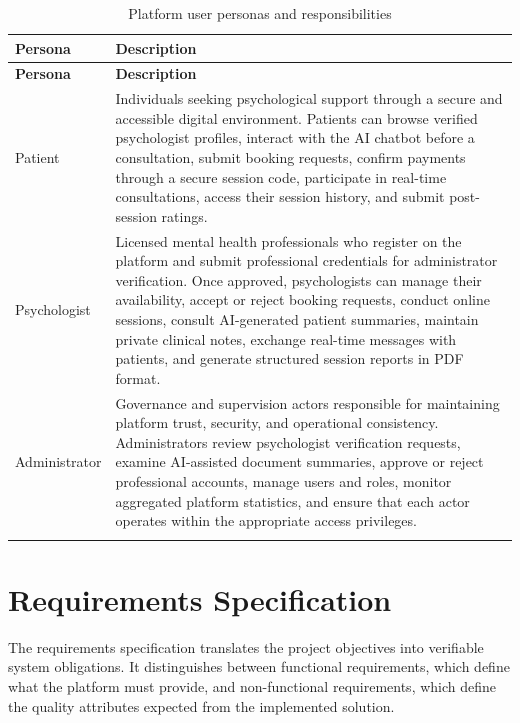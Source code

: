 \documentclass[a4paper,12pt]{report}
\begin{document}
\begin{longtable}{@{} L{3.2cm} L{11.2cm} @{}}
\toprule
\bfseries Persona &
\bfseries Description \\
\midrule
\endfirsthead
\toprule
\bfseries Persona &
\bfseries Description \\
\midrule
\endhead

Patient &
Individuals seeking psychological support through a secure and accessible digital environment. Patients can browse verified psychologist profiles, interact with the AI chatbot before a consultation, submit booking requests, confirm payments through a secure session code, participate in real-time consultations, access their session history, and submit post-session ratings. \\[4pt]
\midrule

Psychologist &
Licensed mental health professionals who register on the platform and submit professional credentials for administrator verification. Once approved, psychologists can manage their availability, accept or reject booking requests, conduct online sessions, consult AI-generated patient summaries, maintain private clinical notes, exchange real-time messages with patients, and generate structured session reports in PDF format. \\[4pt]
\midrule

Administrator &
Governance and supervision actors responsible for maintaining platform trust, security, and operational consistency. Administrators review psychologist verification requests, examine AI-assisted document summaries, approve or reject professional accounts, manage users and roles, monitor aggregated platform statistics, and ensure that each actor operates within the appropriate access privileges. \\

\bottomrule
\caption{Platform user personas and responsibilities}
\label{tab:personas}\\
\end{longtable}

\section{Requirements Specification}

The requirements specification translates the project objectives into verifiable system obligations. It distinguishes between functional requirements, which define what the platform must provide, and non-functional requirements, which define the quality attributes expected from the implemented solution.
\end{document}
